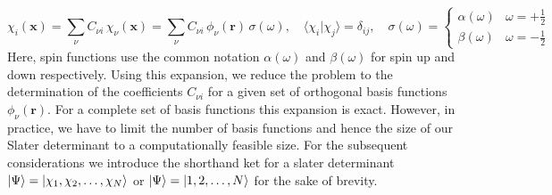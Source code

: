 \begin{equation} %
  \label{eq:spin_orbital_expansion}
  \chi_i(\mathbf x) = \sum_{\nu} C_{\nu i}\,\chi_\nu(\mathbf x) = \sum_{\nu} C_{\nu i}\,\phi_\nu(\mathbf r)\,\sigma(\omega), \quad
  \langle\chi_i|\chi_j\rangle = \delta_{ij},  \quad
  \sigma(\omega) =
    \begin{cases}
      \alpha(\omega)&\omega=+\tfrac12\\
      \beta(\omega)&\omega=-\tfrac12
    \end{cases}
\end{equation}
Here, spin functions use the common notation $\alpha(\omega)$ and $\beta(\omega)$ for spin up and down respectively.
Using this expansion, we reduce the problem to the determination of the coefficients $C_{\nu i}$ for a given set of orthogonal basis functions $\phi_\nu(\mathbf{r})$. For a complete set of basis functions this expansion is exact. However, in practice, we have to limit the number of basis functions and hence the size of our Slater determinant to a computationally feasible size. For the subsequent considerations we introduce the shorthand ket for a slater determinant $\ket{\Psi} = \ket{\chi_1, \chi_2, \ldots, \chi_N}$ or $\ket{\Psi} = \ket{1, 2, \ldots, N}$ for the sake of brevity.

